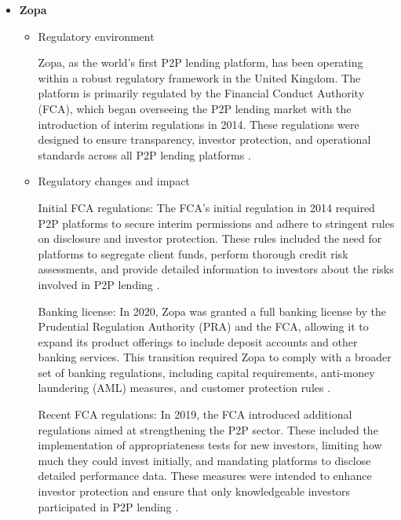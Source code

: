 \documentclass{article}
\begin{document}
\begin{itemize}
\begin{itemize}
        Impact of regulatory changes: Over the years, regulatory changes have prompted Prosper to enhance its compliance and risk management frameworks. For example, increased scrutiny from the SEC and CFPB has led to more robust credit risk assessment processes and improved borrower screening techniques. These changes have helped Prosper maintain its reputation as a trustworthy P2P lending platform \citep{knowledge_at_wharton_peer--peer_2014}.
    \end{itemize}

    \item \textbf{Zopa}
    \begin{itemize}
        \item Regulatory environment

        Zopa, as the world's first P2P lending platform, has been operating within a robust regulatory framework in the United Kingdom. The platform is primarily regulated by the Financial Conduct Authority (FCA), which began overseeing the P2P lending market with the introduction of interim regulations in 2014. These regulations were designed to ensure transparency, investor protection, and operational standards across all P2P lending platforms \citep{fca_fca_2019}.

        \item Regulatory changes and impact

        Initial FCA regulations: The FCA's initial regulation in 2014 required P2P platforms to secure interim permissions and adhere to stringent rules on disclosure and investor protection. These rules included the need for platforms to segregate client funds, perform thorough credit risk assessments, and provide detailed information to investors about the risks involved in P2P lending \citep{fca_ps1914_2018}.
        
        Banking license: In 2020, Zopa was granted a full banking license by the Prudential Regulation Authority (PRA) and the FCA, allowing it to expand its product offerings to include deposit accounts and other banking services. This transition required Zopa to comply with a broader set of banking regulations, including capital requirements, anti-money laundering (AML) measures, and customer protection rules \citep{finextra_p2p_2016}.
        
        Recent FCA regulations: In 2019, the FCA introduced additional regulations aimed at strengthening the P2P sector. These included the implementation of appropriateness tests for new investors, limiting how much they could invest initially, and mandating platforms to disclose detailed performance data. These measures were intended to enhance investor protection and ensure that only knowledgeable investors participated in P2P lending \citep{fca_fca_2019}.
        

\end{itemize}
\end{itemize}
\end{document}
